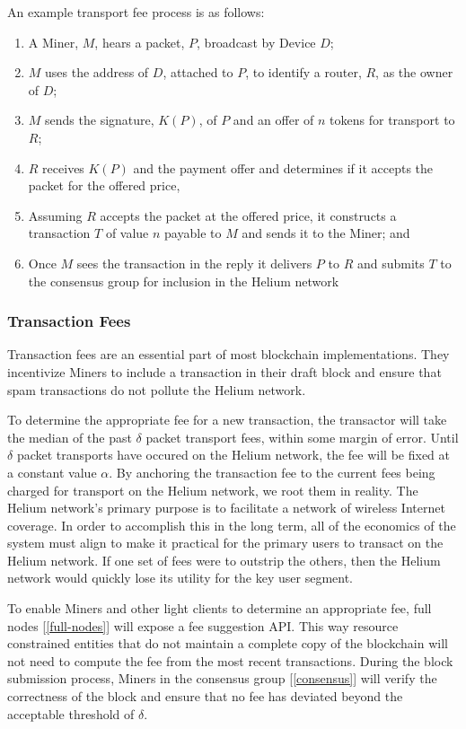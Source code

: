\documentclass[10pt, nonatbib, nocopyrightspace, reprint]{sigplanconf}
\newcommand{\secref}[1]{[\autoref{#1}]}
\begin{document}
An example transport fee process is as follows:

\begin{enumerate}
  \item A Miner, $M$, hears a packet, $P$, broadcast by Device $D$;
  \item $M$ uses the address of $D$, attached to $P$, to identify a router, $R$, as the owner of $D$;
  \item $M$ sends the signature, $K(P)$, of $P$ and an offer of $n$ tokens for transport to $R$;
  \item $R$ receives $K(P)$ and the payment offer and determines if it accepts the packet for the offered price,
  \item Assuming $R$ accepts the packet at the offered price, it constructs a transaction $T$ of value $n$ payable to $M$ and sends it to the Miner; and
  \item Once $M$ sees the transaction in the reply it delivers $P$ to $R$ and submits $T$ to the consensus group for inclusion in the Helium network
\end{enumerate}

\subsubsection{Transaction Fees} \label{fees}

Transaction fees are an essential part of most blockchain implementations. They incentivize Miners to include a transaction in their draft block and ensure that spam transactions do not pollute the Helium network.

To determine the appropriate fee for a new transaction, the transactor will take the median of the past $\delta$ packet transport fees, within some margin of error. Until $\delta$ packet transports have occured on the Helium network, the fee will be fixed at a constant value $\alpha$. By anchoring the transaction fee to the current fees being charged for transport on the Helium network, we root them in reality. The Helium network's primary purpose is to facilitate a network of wireless Internet coverage. In order to accomplish this in the long term, all of the economics of the system must align to make it practical for the primary users to transact on the Helium network. If one set of fees were to outstrip the others, then the Helium network would quickly lose its utility for the key user segment.

To enable Miners and other light clients to determine an appropriate fee, full nodes \secref{full-nodes} will expose a fee suggestion API. This way resource constrained entities that do not maintain a complete copy of the blockchain will not need to compute the fee from the most recent transactions. During the block submission process, Miners in the consensus group \secref{consensus} will verify the correctness of the block and ensure that no fee has deviated beyond the acceptable threshold of $\delta$.
\end{document}
